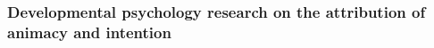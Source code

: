 \documentclass{frontiersSCNS} %
\begin{document}













\subsubsection{Developmental psychology research on the attribution of animacy and intention}
\label{sec:developmental-expl}
\end{document}
